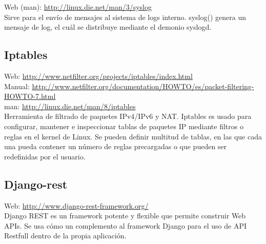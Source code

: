 Web (man): \url{http://linux.die.net/man/3/syslog}\\

Sirve para el envío de mensajes al sistema de logs interno. syslog() genera un mensaje de log, el cuál se distribuye mediante el demonio syslogd.

\subsection{Iptables}

Web: \url{http://www.netfilter.org/projects/iptables/index.html}\\
Manual: \url{http://www.netfilter.org/documentation/HOWTO/es/packet-filtering-HOWTO-7.html}\\
man: \url{http://linux.die.net/man/8/iptables}\\

Herramienta de filtrado de paquetes IPv4/IPv6 y NAT. Iptables es usado para configurar, mantener e inspeccionar tablas de paquetes IP mediante filtros o reglas en el kernel de Linux. Se pueden definir multitud de tablas, en las que cada una pueda contener un número de reglas precargadas o que pueden ser redefinidas por el usuario. \\

\subsection{Django-rest}


Web: \url{http://www.django-rest-framework.org/}\\

Django REST es un framework potente y flexible que permite construir Web APIs. Se usa cómo un complemento al framework Django para el uso de API Restfull dentro de la propia aplicación.

